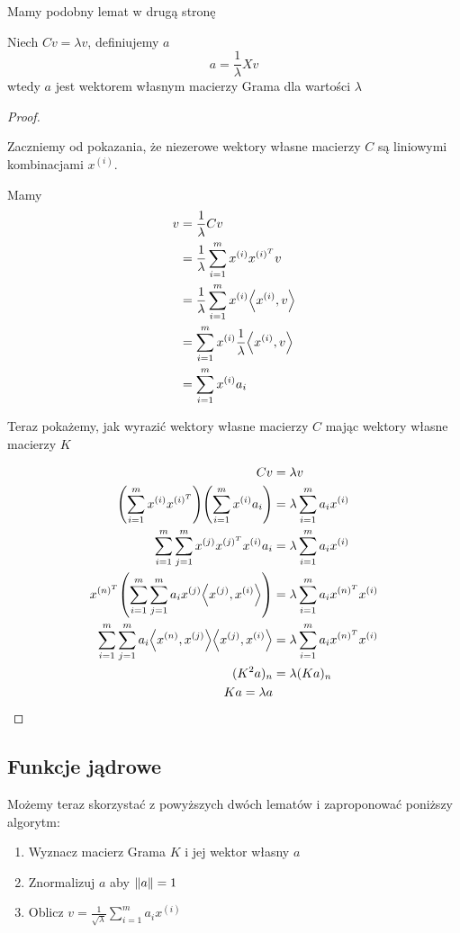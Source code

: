 Mamy podobny lemat w drugą stronę

\begin{lemma}
    Niech \( Cv = \lambda v \), definiujemy \( a \)
    \[
        a = \frac{1}{\lambda}Xv
    \]
    wtedy \( a \) jest wektorem własnym macierzy Grama dla wartości \( \lambda \)
\end{lemma}
\begin{proof} \( \)

Zaczniemy od pokazania, że niezerowe wektory własne macierzy \( C \) są liniowymi kombinacjami \( x^{(i)} \).

Mamy
\begin{align*}
    v 
        &= \frac{1}{\lambda} Cv \\
        &= \frac{1}{\lambda} \sum_{i=1}^m x^{(i)} x^{(i)^T}v \\
        &= \frac{1}{\lambda} \sum_{i=1}^m x^{(i)}\dotproduct{x^{(i)}, v} \\
        &= \sum_{i=1}^m x^{(i)}\frac{1}{\lambda}\dotproduct{x^{(i)}, v} \\
        &= \sum_{i=1}^m x^{(i)} a_i
\end{align*}

Teraz pokażemy, jak wyrazić wektory własne macierzy \( C \) mając wektory własne macierzy \( K \)

\begin{align*}
    Cv &= \lambda v \\
    \pars{\sum_{i=1}^m x^{(i)}x^{(i)^T}}\pars{\sum_{i=1}^m x^{(i)} a_i} &= \lambda \sum_{i=1}^m a_i x^{(i)} \\
    \sum_{i=1}^m \sum_{j=1}^m x^{(j)}x^{(j)^T} x^{(i)} a_i &= \lambda \sum_{i=1}^m a_i x^{(i)} \\
    x^{(n)^T} \pars{\sum_{i=1}^m \sum_{j=1}^m a_i x^{(j)} \dotproduct{x^{(j)}, x^{(i)}} } &= \lambda \sum_{i=1}^m a_i x^{(n)^T} x^{(i)} \\
    \sum_{i=1}^m \sum_{j=1}^m a_i \dotproduct{x^{(n)}, x^{(j)}} \dotproduct{x^{(j)}, x^{(i)}} &= \lambda \sum_{i=1}^m a_i x^{(n)^T} x^{(i)} \\
    (K^2a)_n &= \lambda (Ka)_n \\
    Ka = \lambda a
\end{align*}
\end{proof}

\subsection{Funkcje jądrowe}
Możemy teraz skorzystać z powyższych dwóch lematów i zaproponować poniższy algorytm:
\begin{enumerate}
    \item Wyznacz macierz Grama \( K \) i jej wektor własny \( a \)
    \item Znormalizuj \( a \) aby \( \left\Vert a \right\Vert = 1 \)
    \item Oblicz \( v = \frac{1}{\sqrt{\lambda}} \sum_{i=1}^m a_i x^{(i)} \)
\end{enumerate}

